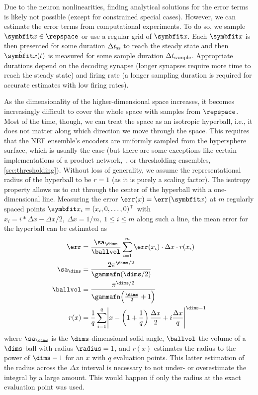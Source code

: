 Due to the neuron nonlinearities, finding analytical solutions for the error terms is likely not possible (except for constrained special cases).
However, we can estimate the error terms from computational experiments.
To do so, we sample $\vc x \in \repspace$ or use a regular grid of $\vc x$.
Each $\vc x$ is then presented for some duration $\Delta t_{{\mathrm{ss}}}$ to reach the steady state and then $\hat{\vc x}(t)$ is measured for some sample duration $\Delta t_{{\mathrm{sample}}}$.
Appropriate durations depend on the decoding synapse (longer synapses require more time to reach the steady state) and firing rate (a longer sampling duration is required for accurate estimates with low firing rates).

As the dimensionality of the higher-dimensional space increases, it becomes increasingly difficult to cover the whole space with samples from $\repspace$.
Most of the time, though, we can treat the space as an isotropic hyperball, i.e., it does not matter along which direction we move through the space.
This requires that the NEF ensemble's encoders are uniformly sampled from the hypersphere surface, which is usually the case (but there are some exceptions like certain implementations of a product network,~\cite{gosmann2015-1}, or thresholding ensembles, \cref{sec:thresholding}).
Without loss of generality, we assume the representational radius of the hyperball to be $r = 1$ (as it is purely a scaling factor).
The isotropy property allows us to cut through the center of the hyperball with a one-dimensional line.
Measuring the error $\err(x) = \err(\vc x)$ at $m$ regularly spaced points $\vc x_i = (x_i, 0, \dotsc, 0)\Tr$ with $x_i = i * \Delta x - \Delta x/2,\ \Delta x = 1/m,\ 1 \leq i \leq m$ along such a line, the mean error for the hyperball can be estimated as
\begin{align}
    \err &= \frac{\sa_{\dims}}{\ballvol} \sum_{i=1}^{m} \err(x_i) \cdot \Delta x \cdot r(x_i) \\
    \sa_{\dims} &= \frac{2 \pi^{\dims/2}}{\gammafn(\dims/2)} \\
    \ballvol &= \frac{\pi^{\dims/2}}{\gammafn\!\del{\frac{\dims}{2} + 1}} \\
    r(x) &= \frac{1}{q} \sum_{i=1}^{q} \abs{x - \del{1 + \frac{1}{q}} \frac{\Delta x}{2} + i \frac{\Delta x}{q}}^{\dims - 1}
\end{align}
where $\sa_{\dims}$ is the $\dims$-dimensional solid angle, $\ballvol$ the volume of a $\dims$-ball with radius $\radius = 1$, and $r(x)$ estimates the radius to the power of $\dims-1$ for an $x$ with $q$ evaluation points.
This latter estimation of the radius across the $\Delta x$ interval is necessary to not under- or overestimate the integral by a large amount.
This would happen if only the radius at the exact evaluation point was used.



